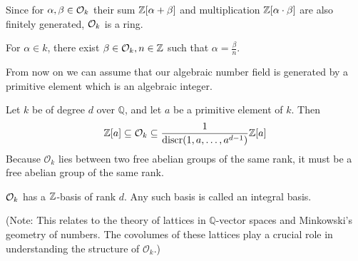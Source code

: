 \begin{outline}
    
    \1 Since for $\alpha,\beta \in \mathcal{O}_k$ their sum $\mathbb{Z}[\alpha+\beta]$ and multiplication $\mathbb{Z}[\alpha\cdot\beta]$ are also finitely generated, $\mathcal{O}_k$ is a ring.
    
    \0 \begin{lemma}
        For $\alpha \in k$, there exist $\beta \in \mathcal{O}_k, n\in\mathbb{Z}$ such that $\alpha=\frac{\beta}{n}$.
    \end{lemma}
    
    From now on we can assume that our algebraic number field is generated by a primitive element which is an algebraic integer.
    
    \begin{proposition}
        Let $k$ be of degree $d$ over $\mathbb{Q}$, and let $a$ be a primitive element of $k$. Then 
        $$\mathbb{Z}[a] \subseteq \mathcal{O}_k \subseteq \frac{1}{\operatorname{discr}({1,a,\ldots,a^{d-1}})} \mathbb{Z}[a]$$
        Because $\mathcal{O}_k$ lies between two free abelian groups of the same rank, it must be a free abelian group of the same rank.
    \end{proposition}
    
    \begin{corollary}
        $\mathcal{O}_k$ has a $\mathbb{Z}$-basis of rank $d$. Any such basis is called an integral basis.
    \end{corollary}
    (Note: This relates to the theory of lattices in $\mathbb{Q}$-vector spaces and Minkowski's geometry of numbers. The covolumes of these lattices play a crucial role in understanding the structure of $\mathcal{O}_k$.)
    

\end{outline}
